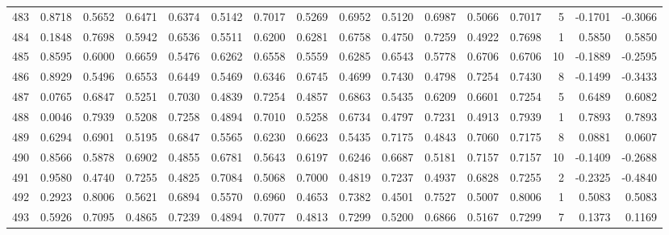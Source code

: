 \begin{tabular}{lrrrrrrrrrrrrrrr}
483 &      0.8718 &  0.5652 &  0.6471 &  0.6374 &  0.5142 &  0.7017 &  0.5269 &  0.6952 &  0.5120 &  0.6987 &   0.5066 &     0.7017 &      5 &                   -0.1701 &                    -0.3066 \\
484 &      0.1848 &  0.7698 &  0.5942 &  0.6536 &  0.5511 &  0.6200 &  0.6281 &  0.6758 &  0.4750 &  0.7259 &   0.4922 &     0.7698 &      1 &                    0.5850 &                     0.5850 \\
485 &      0.8595 &  0.6000 &  0.6659 &  0.5476 &  0.6262 &  0.6558 &  0.5559 &  0.6285 &  0.6543 &  0.5778 &   0.6706 &     0.6706 &     10 &                   -0.1889 &                    -0.2595 \\
486 &      0.8929 &  0.5496 &  0.6553 &  0.6449 &  0.5469 &  0.6346 &  0.6745 &  0.4699 &  0.7430 &  0.4798 &   0.7254 &     0.7430 &      8 &                   -0.1499 &                    -0.3433 \\
487 &      0.0765 &  0.6847 &  0.5251 &  0.7030 &  0.4839 &  0.7254 &  0.4857 &  0.6863 &  0.5435 &  0.6209 &   0.6601 &     0.7254 &      5 &                    0.6489 &                     0.6082 \\
488 &      0.0046 &  0.7939 &  0.5208 &  0.7258 &  0.4894 &  0.7010 &  0.5258 &  0.6734 &  0.4797 &  0.7231 &   0.4913 &     0.7939 &      1 &                    0.7893 &                     0.7893 \\
489 &      0.6294 &  0.6901 &  0.5195 &  0.6847 &  0.5565 &  0.6230 &  0.6623 &  0.5435 &  0.7175 &  0.4843 &   0.7060 &     0.7175 &      8 &                    0.0881 &                     0.0607 \\
490 &      0.8566 &  0.5878 &  0.6902 &  0.4855 &  0.6781 &  0.5643 &  0.6197 &  0.6246 &  0.6687 &  0.5181 &   0.7157 &     0.7157 &     10 &                   -0.1409 &                    -0.2688 \\
491 &      0.9580 &  0.4740 &  0.7255 &  0.4825 &  0.7084 &  0.5068 &  0.7000 &  0.4819 &  0.7237 &  0.4937 &   0.6828 &     0.7255 &      2 &                   -0.2325 &                    -0.4840 \\
492 &      0.2923 &  0.8006 &  0.5621 &  0.6894 &  0.5570 &  0.6960 &  0.4653 &  0.7382 &  0.4501 &  0.7527 &   0.5007 &     0.8006 &      1 &                    0.5083 &                     0.5083 \\
493 &      0.5926 &  0.7095 &  0.4865 &  0.7239 &  0.4894 &  0.7077 &  0.4813 &  0.7299 &  0.5200 &  0.6866 &   0.5167 &     0.7299 &      7 &                    0.1373 &                     0.1169 \\

\end{tabular}
